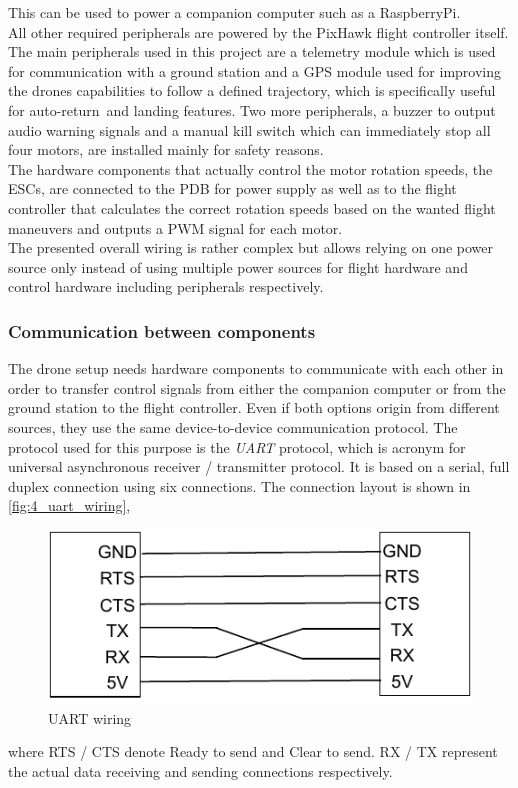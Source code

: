This can be used to power a companion computer such as a RaspberryPi.\\
All other required peripherals are powered by the PixHawk flight controller
itself.
The main peripherals used in this project are a telemetry module which is used
for communication with a ground station and a \ac{GPS} module used for
improving the drones capabilities to follow a defined trajectory, which is
specifically useful for auto-return~and landing features.
Two more peripherals, a buzzer to output audio warning signals and a manual
kill switch which can immediately stop all four motors, are installed mainly
for safety reasons.\\
The hardware components that actually control the motor rotation speeds,
the \acp{ESC}, are connected to the \ac{PDB} for power supply as well as to
the flight controller that calculates the correct rotation speeds based on the
wanted flight maneuvers and outputs a \ac{PWM} signal for each motor.\\
The presented overall wiring is rather complex but allows relying on one power
source only instead of using multiple power sources for flight hardware and
control hardware including peripherals respectively.

\subsubsection{Communication between components}\label{subsec:4_comm}
The drone setup needs hardware components to communicate with each other in 
order to transfer control signals from either the companion computer or from
the ground station to the flight controller.
Even if both options origin from different sources, they use the same
device-to-device communication protocol.
The protocol used for this purpose is the \textit{UART} protocol, which is
acronym for universal asynchronous receiver / transmitter protocol.
It is based on a serial, full duplex connection using six connections.
The connection layout is shown in \autoref{fig:4_uart_wiring},
\begin{figure}[!h]
    \centering
    \includegraphics[scale=0.8]{uart_wiring.pdf}
    \caption[UART wiring]{UART wiring}
    \label{fig:4_uart_wiring}
\end{figure}
\FloatBarrier
\noindent where RTS / CTS denote Ready to send and Clear to send.
RX / TX represent the actual data receiving and sending connections
respectively.\\

